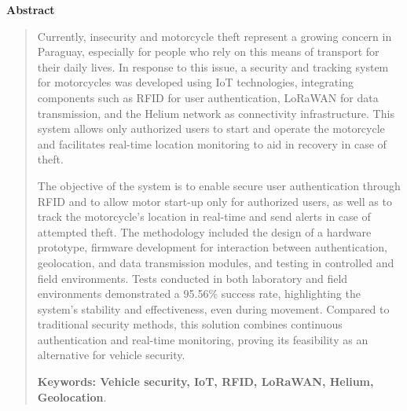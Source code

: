 \cleardoublepage
\thispagestyle{empty}
\begin{center}
\begin{LARGE}
\textbf{Abstract}
\end{LARGE}
\end{center}

\begin{quotation}

Currently, insecurity and motorcycle theft represent a growing concern in Paraguay, especially for people who rely on this means of transport for their daily lives. In response to this issue, a security and tracking system for motorcycles was developed using IoT technologies, integrating components such as RFID for user authentication, LoRaWAN for data transmission, and the Helium network as connectivity infrastructure. This system allows only authorized users to start and operate the motorcycle and facilitates real-time location monitoring to aid in recovery in case of theft.

The objective of the system is to enable secure user authentication through RFID and to allow motor start-up only for authorized users, as well as to track the motorcycle's location in real-time and send alerts in case of attempted theft. The methodology included the design of a hardware prototype, firmware development for interaction between authentication, geolocation, and data transmission modules, and testing in controlled and field environments. Tests conducted in both laboratory and field environments demonstrated a 95.56\% success rate, highlighting the system's stability and effectiveness, even during movement. Compared to traditional security methods, this solution combines continuous authentication and real-time monitoring, proving its feasibility as an alternative for vehicle security.

\vspace*{0.5cm}

\noindent \textbf{Keywords: Vehicle security, IoT, RFID, LoRaWAN, Helium, Geolocation}.
\end{quotation}
